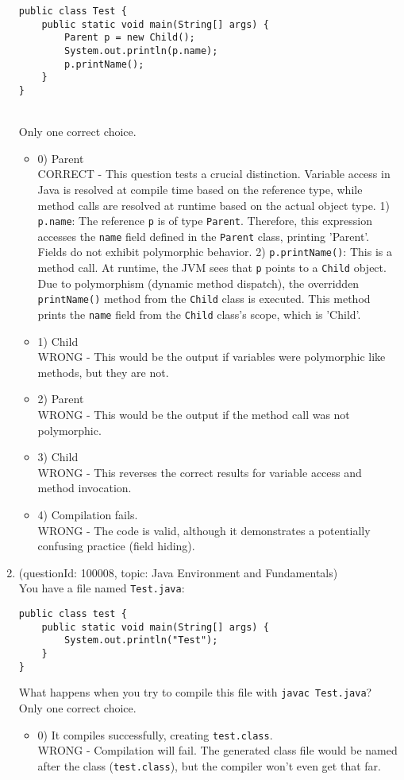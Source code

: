 \documentclass[12pt]{article}
\begin{document}
\begin{enumerate}[label=(\arabic*)]
\begin{verbatim}
public class Test {
    public static void main(String[] args) {
        Parent p = new Child();
        System.out.println(p.name);
        p.printName();
    }
}
\end{verbatim}
\\ \noindent Only one correct choice. 
\begin{itemize}
\item 0) Parent\nChild
 \\ 
CORRECT - This question tests a crucial distinction. Variable access in Java is resolved at compile time based on the reference type, while method calls are resolved at runtime based on the actual object type. 1) \verb|p.name|: The reference \verb|p| is of type \verb|Parent|. Therefore, this expression accesses the \verb|name| field defined in the \verb|Parent| class, printing 'Parent'. Fields do not exhibit polymorphic behavior. 2) \verb|p.printName()|: This is a method call. At runtime, the JVM sees that \verb|p| points to a \verb|Child| object. Due to polymorphism (dynamic method dispatch), the overridden \verb|printName()| method from the \verb|Child| class is executed. This method prints the \verb|name| field from the \verb|Child| class's scope, which is 'Child'.

\item 1) Child\nChild
 \\ 
WRONG - This would be the output if variables were polymorphic like methods, but they are not.

\item 2) Parent\nParent
 \\ 
WRONG - This would be the output if the method call was not polymorphic.

\item 3) Child\nParent
 \\ 
WRONG - This reverses the correct results for variable access and method invocation.

\item 4) Compilation fails.
 \\ 
WRONG - The code is valid, although it demonstrates a potentially confusing practice (field hiding).

\end{itemize}
\item (questionId: 100008, topic: Java Environment and Fundamentals) \\ 
You have a file named \verb|Test.java|:
\begin{verbatim}
public class test {
    public static void main(String[] args) {
        System.out.println("Test");
    }
}
\end{verbatim}
What happens when you try to compile this file with \verb|javac Test.java|?
\\ \noindent Only one correct choice. 
\begin{itemize}
\item 0) It compiles successfully, creating \verb|test.class|.
 \\ 
WRONG - Compilation will fail. The generated class file would be named after the class (\verb|test.class|), but the compiler won't even get that far.


\end{itemize}
\end{enumerate}
\end{document}
